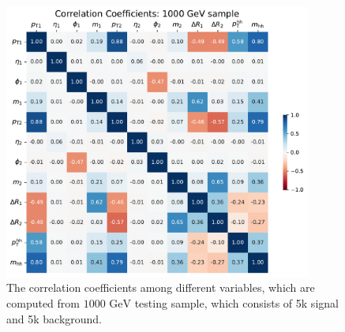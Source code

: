 \documentclass[12pt]{article}
\begin{document}
		\begin{figure}[htpb]
			\centering
			\includegraphics[width=0.9\textwidth]{correlation_coefficients-1000GeV.pdf}
			\caption{The correlation coefficients among different variables, which are computed from $\text{1000 GeV}$ testing sample, which consists of 5k signal and 5k background.}
			\label{fig:correlation_coefficient_1000GeV}
		\end{figure}
\end{document}
